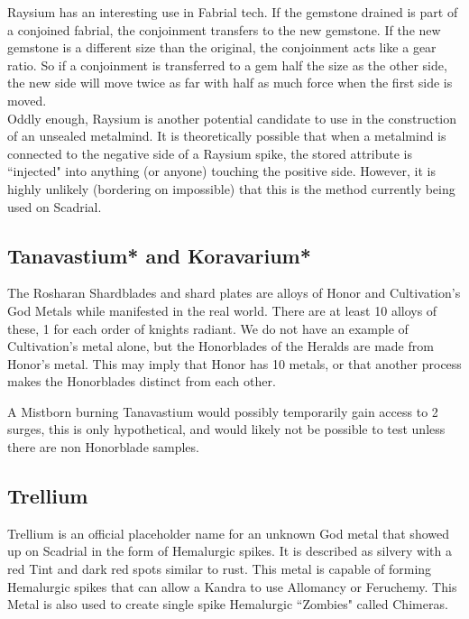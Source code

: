 \documentclass[conference]{IEEEtran}
\begin{document}
Raysium has an interesting use in Fabrial tech.  If the gemstone drained is part of a conjoined fabrial, the conjoinment transfers to the new gemstone.  If the new gemstone is a different size than the original, the conjoinment acts like a gear ratio.  So if a conjoinment is transferred to a gem half the size as the other side, the new side will move twice as far with half as much force when the first side is moved.\cite{RoW-CH84}\\

Oddly enough, Raysium is another potential candidate to use in the construction of an unsealed metalmind.  It is theoretically possible that when a metalmind is connected to the negative side of a Raysium spike, the stored attribute is ``injected" into anything (or anyone) touching the positive side.  However, it is highly unlikely (bordering on impossible) that this is the method currently being used on Scadrial.  
\subsection*{Tanavastium*\cite{honor-name} and Koravarium*\cite{cultiv-name}}
The Rosharan Shardblades and shard plates are alloys of Honor and Cultivation's God Metals while manifested in the real world.  There are at least 10 alloys of these, 1 for each order of knights radiant.\cite{shard-alloy}  We do not have an example of Cultivation's metal alone, but the Honorblades of the Heralds are made from Honor's metal.\cite{honorblade}  This may imply that Honor has 10 metals, or that another process makes the Honorblades distinct from each other.

A Mistborn burning Tanavastium would possibly temporarily gain access to 2 surges, this is only hypothetical, and would likely not be possible to test unless there are non Honorblade samples.

\subsection*{Trellium\cite{trellium}}
Trellium is an official placeholder name for an unknown God metal that showed up on Scadrial in the form of Hemalurgic spikes.\cite{trellium}  It is described as silvery with a red Tint and dark red spots similar to rust.\cite{SoS-EP}  This metal is capable of forming Hemalurgic spikes that can allow a Kandra to use Allomancy or Feruchemy.\cite{SoS-CH7}  This Metal is also used to create single spike Hemalurgic ``Zombies" called Chimeras.\cite{SoS-CH21}\\
\end{document}
